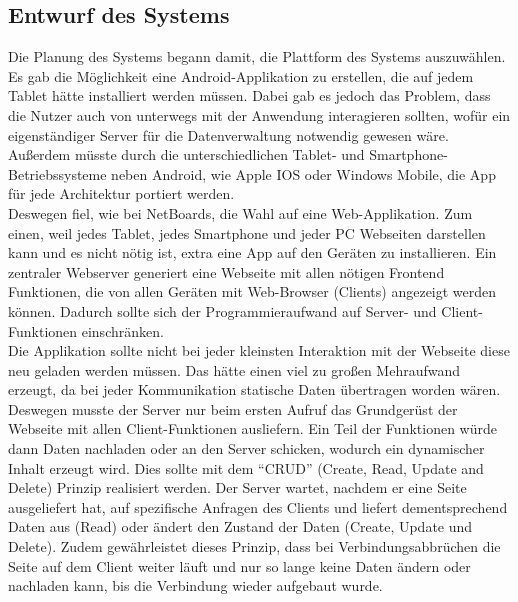 \subsection{Entwurf des Systems}\label{Entwurf des Systems}
Die Planung des Systems begann damit, die Plattform des Systems auszuwählen.
Es gab die Möglichkeit eine Android-Applikation zu erstellen, die auf jedem Tablet hätte installiert werden müssen.
Dabei gab es jedoch das Problem, dass die Nutzer auch von unterwegs mit der Anwendung interagieren sollten, wofür ein eigenständiger Server für die Datenverwaltung notwendig gewesen wäre.
Außerdem müsste durch die unterschiedlichen Tablet- und Smartphone-Betriebssysteme neben Android, wie Apple IOS oder Windows Mobile, die App für jede Architektur portiert werden.
\\
Deswegen fiel, wie bei NetBoards, die Wahl auf eine Web-Applikation. Zum einen, weil jedes Tablet, jedes Smartphone und jeder PC Webseiten darstellen kann und es nicht nötig ist, extra eine App auf den Geräten zu installieren.
Ein zentraler Webserver generiert eine Webseite mit allen nötigen Frontend Funktionen, die von allen Geräten mit Web-Browser (Clients) angezeigt werden können. Dadurch sollte sich der Programmieraufwand auf Server- und Client-Funktionen einschränken.
\\
Die Applikation sollte nicht bei jeder kleinsten Interaktion mit der Webseite diese neu geladen werden müssen. Das hätte einen viel zu großen Mehraufwand erzeugt, da bei jeder Kommunikation statische Daten übertragen worden wären.
Deswegen musste der Server nur beim ersten Aufruf das Grundgerüst der Webseite mit allen Client-Funktionen ausliefern. Ein Teil der Funktionen würde dann Daten nachladen oder an den Server schicken, wodurch ein dynamischer Inhalt erzeugt wird.
Dies sollte mit dem ``CRUD'' (Create, Read, Update and Delete) Prinzip realisiert werden.
Der Server wartet, nachdem er eine Seite ausgeliefert hat, auf spezifische Anfragen des Clients und liefert dementsprechend Daten aus (Read) oder ändert den Zustand der Daten (Create, Update und Delete). Zudem gewährleistet dieses Prinzip, dass bei Verbindungsabbrüchen die Seite auf dem Client weiter läuft und nur so lange keine Daten ändern oder nachladen kann, bis die Verbindung wieder aufgebaut wurde.
\\
